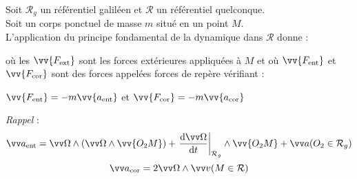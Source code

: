 ﻿\documentclass[a4paper]{article}
\begin{document}
\pagestyle{fancy}
\fancyhf{}
\setlength{\headheight}{15pt}

\begin{center}
	\large{}
\end{center}


Soit \(\mathcal{R}_g\) un référentiel galiléen et \(\mathcal{R}\) un référentiel quelconque.\\
Soit un corps ponctuel de masse \(m\) situé en un point \(M\).\\
L'application du principe fondamental de la dynamique dans \(\mathcal{R}\) donne :
\begin{center}\end{center}où les \(\vv{F_{\mathrm{ext}}}\) sont les forces extérieures appliquées à \(M\) et où \(\vv{F_{\mathrm{ent}}}\) et \(\vv{F_{\mathrm{cor}}}\) sont des forces appelées forces de repère vérifiant :
\begin{center}\(\vv{F_{\mathrm{ent}}}=-m\vv{a_{\mathrm{ent}}}\) et \(\vv{F_{\mathrm{cor}}}=-m\vv{a_{\mathrm{cor}}}\)\end{center}

\emph{Rappel} :
\[\vv a_{\mathrm{ent}} = \vv \Omega \wedge ( \vv \Omega \wedge \vv{O_2M}) + \left. \frac{\mathrm{d} \vv \Omega}{\mathrm{d}t}\right|_{\mathcal R_g} \wedge \vv{O_2 M} + \vv a (O_2 \in \mathcal R_g)\]
\[\vv a_{\mathrm{cor}} = 2 \vv \Omega \wedge \vv v(M \in \mathcal R)\]
\end{document}
